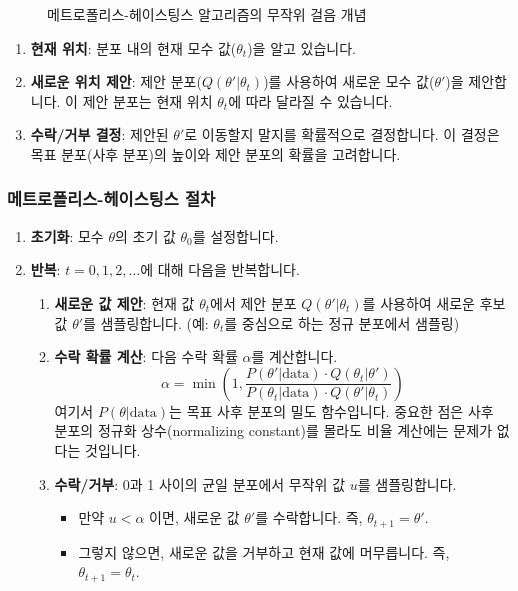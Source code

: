 \documentclass[11pt,a4paper]{article}
\theoremstyle{definition}
\begin{document}
\begin{figure}[h!]
    \centering
    \caption{메트로폴리스-헤이스팅스 알고리즘의 무작위 걸음 개념}
    \label{fig:metropolis_hastings_walk}
\end{figure}

\begin{infobox}[title=메트로폴리스-헤이스팅스 알고리즘의 핵심 아이디어]
\begin{enumerate}
    \item \textbf{현재 위치}: 분포 내의 현재 모수 값($\theta_t$)을 알고 있습니다.
    \item \textbf{새로운 위치 제안}: 제안 분포($Q(\theta' | \theta_t)$)를 사용하여 새로운 모수 값($\theta'$)을 제안합니다. 이 제안 분포는 현재 위치 $\theta_t$에 따라 달라질 수 있습니다.
    \item \textbf{수락/거부 결정}: 제안된 $\theta'$로 이동할지 말지를 확률적으로 결정합니다. 이 결정은 목표 분포(사후 분포)의 높이와 제안 분포의 확률을 고려합니다.
\end{enumerate}
\end{infobox}

\subsubsection*{메트로폴리스-헤이스팅스 절차}
\begin{enumerate}
    \item \textbf{초기화}: 모수 $\theta$의 초기 값 $\theta_0$를 설정합니다.
    \item \textbf{반복}: $t=0, 1, 2, \dots$에 대해 다음을 반복합니다.
    \begin{enumerate}
        \item \textbf{새로운 값 제안}: 현재 값 $\theta_t$에서 제안 분포 $Q(\theta' | \theta_t)$를 사용하여 새로운 후보 값 $\theta'$를 샘플링합니다. (예: $\theta_t$를 중심으로 하는 정규 분포에서 샘플링)
        \item \textbf{수락 확률 계산}: 다음 수락 확률 $\alpha$를 계산합니다.
        \[ \alpha = \min \left( 1, \frac{P(\theta' | \text{data}) \cdot Q(\theta_t | \theta')}{P(\theta_t | \text{data}) \cdot Q(\theta' | \theta_t)} \right) \]
        여기서 $P(\theta | \text{data})$는 목표 사후 분포의 밀도 함수입니다. 중요한 점은 사후 분포의 정규화 상수(normalizing constant)를 몰라도 비율 계산에는 문제가 없다는 것입니다.
        \item \textbf{수락/거부}: 0과 1 사이의 균일 분포에서 무작위 값 $u$를 샘플링합니다.
        \begin{itemize}
            \item 만약 $u < \alpha$ 이면, 새로운 값 $\theta'$를 수락합니다. 즉, $\theta_{t+1} = \theta'$.
            \item 그렇지 않으면, 새로운 값을 거부하고 현재 값에 머무릅니다. 즉, $\theta_{t+1} = \theta_t$.
        \end{itemize}
    \end{enumerate}
\end{enumerate}
\end{document}
